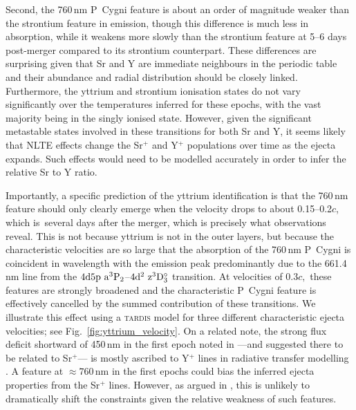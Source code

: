 \documentclass{aa}
\begin{document}
Second, the 760\,nm P~Cygni feature is about an order of magnitude weaker than the strontium feature in emission, though this difference is much less in absorption, while it weakens more slowly than the strontium feature at 5--6 days post-merger compared to its strontium counterpart. These differences are surprising given that Sr and Y are immediate neighbours in the periodic table and their abundance and radial distribution should be closely linked. Furthermore, the yttrium and strontium ionisation states do not vary significantly over the temperatures inferred for these epochs, with the vast majority being in the singly ionised state. However, given the significant
metastable states involved
in these transitions for both Sr and Y, it seems likely that NLTE effects change the Sr\(^+\) and Y\(^+\) populations over time as the ejecta expands. Such effects would need to be modelled accurately in order to infer the relative Sr to Y ratio. 

Importantly, a specific prediction of the yttrium identification is that the 760\,nm feature should only clearly emerge when the velocity drops to about 0.15--0.2\(c\), which is\ several days after the merger, which is precisely what observations reveal. This is not because yttrium is not in the outer layers, but because the characteristic velocities are so large that the absorption of the 760\,nm P~Cygni is coincident in wavelength with the emission peak predominantly due to the 661.4\,nm line from the $4{\rm d}5{\rm p}~{\rm a}^3{\rm P}_2$--$4{\rm d}^2~{\rm z}^3{\rm D}_3^\circ$ transition. At velocities of $0.3c,$ these features are strongly broadened and the characteristic P~Cygni feature is effectively cancelled by the summed contribution of these transitions. We illustrate this effect using a \textsc{tardis} model for three different characteristic ejecta velocities; see Fig.~\ref{fig:yttrium_velocity}. On a related note, the strong flux deficit shortward of 450\,nm in the first epoch noted in \citet{Watson2019} ---and suggested there to be related to Sr\(^+\)--- is mostly ascribed to Y\(^+\) lines in radiative transfer modelling \citep{Gillanders2022,Domoto2022,Vieira2023}. %
A feature at $\approx760$\,nm in the first epochs could bias the inferred ejecta properties from the Sr\(^+\) lines. However, as argued in \citet{Sneppen2023}, this is unlikely to dramatically shift the constraints given the relative weakness of such features.
\end{document}
